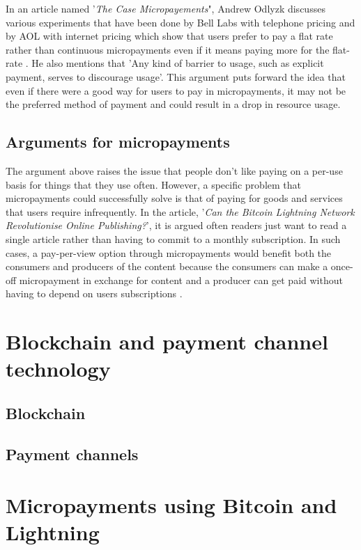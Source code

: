     In an article named '\textit{The Case Micropayements}", Andrew Odlyzk discusses various experiments that have been done by Bell Labs with telephone pricing and by AOL with internet pricing which show that users prefer to pay a flat rate rather than continuous micropayments even if it means paying more for the flat-rate \parencite{case_against_micro}. He also mentions that 'Any kind of barrier to usage, such as explicit payment, serves to discourage usage'. This argument puts forward the idea that even if there were a good way for users to pay in micropayments, it may not be the preferred method of payment and could result in a drop in resource usage.
    
    \subsection{Arguments for micropayments}
    The argument above raises the issue that people don’t like paying on a per-use basis for things that they use often. However, a specific problem that micropayments could successfully solve is that of paying for goods and services that users require infrequently. In the article, '\textit{Can the Bitcoin Lightning Network Revolutionise Online Publishing?}', it is argued often readers just want to read a single article rather than having to commit to a monthly subscription. In such cases, a pay-per-view option through micropayments would benefit both the consumers and producers of the content because the consumers can make a once-off micropayment in exchange for content and a producer can get paid without having to depend on users subscriptions \parencite{micropay_rev}.
    

\section{Blockchain and payment channel technology}

    \subsection{Blockchain}
    
    \subsection{Payment channels}
    
\section{Micropayments using Bitcoin and Lightning}




